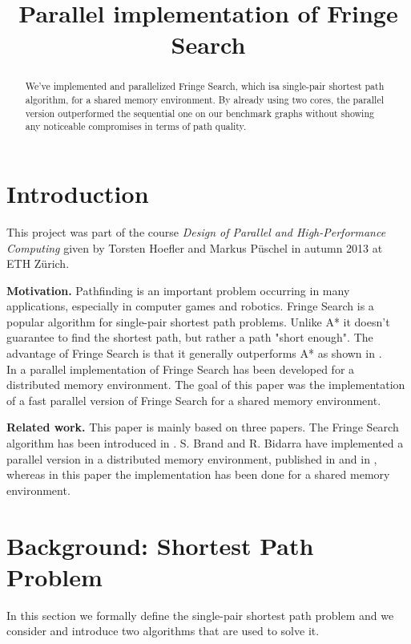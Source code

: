 \documentclass[letterpaper]{article}
\title{Parallel implementation of Fringe Search}
\newcommand{\mypar}[1]{{\bf #1.}}
\begin{document}
%
\maketitle
%

\begin{abstract}
We've implemented and parallelized Fringe Search, which isa single-pair shortest path algorithm, for a shared memory environment. By already using two cores, the parallel version outperformed the sequential one on our benchmark graphs without showing any noticeable compromises in terms of path quality.
\end{abstract}

\section{Introduction}\label{sec:intro}

This project was part of the course \textit{Design of Parallel and High-Performance Computing} given by Torsten Hoefler and Markus Püschel in autumn 2013 at ETH Zürich.


\mypar{Motivation} 
Pathfinding is an important problem occurring in many applications, especially in computer games and robotics. Fringe Search is a popular algorithm for single-pair shortest path problems. Unlike A* it doesn't guarantee to find the shortest path, but rather a path "short enough". The advantage of Fringe Search is that it generally outperforms A* as shown in \cite{fringe:05}.\\
In \cite{brand:09} a parallel implementation of Fringe Search has been developed for a distributed memory environment. The goal of this paper was the implementation of a fast parallel version of Fringe Search for a shared memory environment.

\mypar{Related work} This paper is mainly based on three papers. The Fringe Search algorithm has been introduced in \cite{fringe:05}. S. Brand and R. Bidarra have implemented a parallel version in a distributed memory environment, published in \cite{brand:09} and in \cite{brand:12}, whereas in this paper the implementation has been done for a shared memory environment.

\section{Background: Shortest Path Problem}\label{sec:background}
In this section we formally define the single-pair shortest path problem and we consider and introduce two algorithms that are used to solve it.
\end{document}
